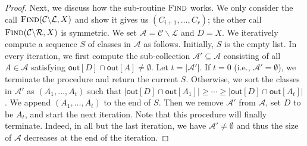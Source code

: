 \documentclass[english]{lipics-v2021}
\begin{document}
\begin{proof}
Next, we discuss how the sub-routine $\textsc{Find}$ works.
We only consider the call $\textsc{Find}(\mathcal{C} \backslash \mathcal{L},X)$ and show it gives us $(C_{i+1},\dots,C_r)$; the other call $\textsc{Find}(\mathcal{C} \backslash \mathcal{R},X)$ is symmetric.
We set $\mathcal{A} = \mathcal{C} \backslash \mathcal{L}$ and $D = X$.
We iteratively compute a sequence $S$ of classes in $\mathcal{A}$ as follows.
Initially, $S$ is the empty list.
In every iteration, we first compute the sub-collection $\mathcal{A}' \subseteq \mathcal{A}$ consisting of all $A \in \mathcal{A}$ satisfying $\mathsf{out}[D] \cap \mathsf{out}[A] \neq \emptyset$.
Let $t = |\mathcal{A}'|$.
If $t = 0$ (i.e., $\mathcal{A}' = \emptyset$), we terminate the procedure and return the current $S$.
Otherwise, we sort the classes in $\mathcal{A}'$ as $(A_1,\dots,A_t)$ such that $|\mathsf{out}[D] \cap \mathsf{out}[A_1]| \geq \cdots \geq |\mathsf{out}[D] \cap \mathsf{out}[A_t]|$.
We append $(A_1,\dots,A_t)$ to the end of $S$.
Then we remove $\mathcal{A}'$ from $\mathcal{A}$, set $D$ to be $A_t$, and start the next iteration.
Note that this procedure will finally terminate.
Indeed, in all but the last iteration, we have $\mathcal{A}' \neq \emptyset$ and thus the size of $\mathcal{A}$ decreases at the end of the iteration.


\end{proof}
\end{document}
